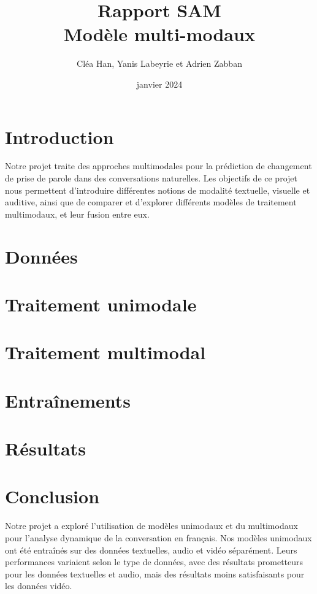 \documentclass[a4paper]{article}
\title{Rapport SAM \\ Modèle multi-modaux}
\author{Cléa Han, Yanis Labeyrie et Adrien Zabban}
\date{janvier 2024}
\begin{document}
\maketitle
\bigskip
\tableofcontents
\newpage

\section{Introduction}

Notre projet traite des approches multimodales pour la prédiction de changement de prise de parole dans des conversations naturelles. 
Les objectifs de ce projet nous permettent d'introduire différentes notions de modalité textuelle, visuelle et auditive, ainsi que de
comparer et d'explorer différents modèles de traitement multimodaux, et leur fusion entre eux.

\section{Données}


\section{Traitement unimodale}


\section{Traitement multimodal}


\section{Entraînements}


\section{Résultats}



\section{Conclusion}

Notre projet a exploré l'utilisation de modèles unimodaux et du multimodaux pour l'analyse dynamique de la conversation en français.
Nos modèles unimodaux ont été entraînés sur des données textuelles, audio et vidéo séparément. Leurs performances variaient selon le type de données, avec des résultats prometteurs pour les données textuelles et audio, mais des résultats moins satisfaisants pour les données vidéo.
\end{document}
